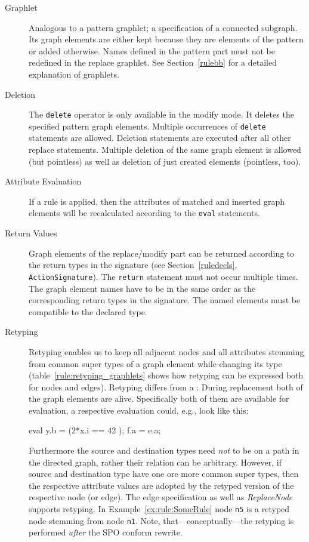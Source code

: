 \begin{description}
  \item[Graphlet] Analogous to a pattern graphlet; a specification of a connected subgraph. Its graph elements are either kept because they are elements of the pattern or added otherwise. Names defined in the pattern part must not be redefined in the replace graphlet. See Section~\ref{rulebb} for a detailed explanation of graphlets. 
  \item[Deletion] The \texttt{delete} operator is only available in the modify mode. It deletes the specified pattern graph elements. Multiple occurrences of \texttt{delete} statements are allowed. Deletion statements are executed after all other replace statements. Multiple deletion of the same graph element is allowed (but pointless) as well as deletion of just created elements (pointless, too).
  \item[Attribute Evaluation] If a rule is applied, then the attributes of matched and inserted graph elements will be recalculated according to the \texttt{eval} statements.
  \item[Return Values] Graph elements of the replace/modify part can be returned according to the return types in the signature (see Section~\ref{ruledecls}, \texttt{ActionSignature}). The \texttt{return} statement must not occur multiple times. The graph element names have to be in the same order as the corresponding return types in the signature. The named elements must be compatible to the declared type.
  \item[Retyping] Retyping enables us to keep all adjacent nodes and all attributes stemming from common super types of a graph element while changing its type (table~\ref{rule:retyping_graphlets} shows how retyping can be expressed both for nodes and edges).
  Retyping differs from a : During replacement both of the graph elements are alive.
  Specifically both of them are available for evaluation, a respective evaluation could, e.g., look like this:
  \begin{grgenlet}
eval {
  y.b = (2*x.i == 42 );
  f.a = e.a;
}
  \end{grgenlet}
  Furthermore the source and destination types need \emph{not} to be on a path in the directed  graph, rather their relation can be arbitrary.
  However, if source and destination type have one ore more common super types, then the respective attribute values are adopted by the retyped version of the respective node (or edge).
  The edge specification as well as \emph{ReplaceNode} supports retyping. 
  In Example~\ref{ex:rule:SomeRule} node \texttt{n5} is a retyped node stemming from node \texttt{n1}.
  Note, that---conceptually---the retyping is performed \emph{after} the SPO conform rewrite.
\end{description} 

